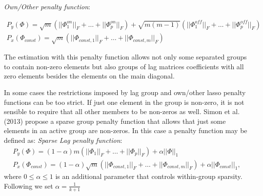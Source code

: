 \documentclass[12pt]{article} %
\begin{document}
\textit{Own/Other penalty function}:  

\begin{gather}
P_y(\Phi) = \sqrt{m} \left( ||\Phi_1^{on}||_{F}+\ldots + ||\Phi_p^{on}||_{F} \right)+\sqrt{m(m-1)}\left( ||\Phi_1^{off}||_{F}+\ldots + ||\Phi_p^{off}||_{F} \right) \\
P_x(\Phi_{const})= \sqrt{m}  \left( ||\Phi_{const,1}||_{F}+\ldots + ||\Phi_{const,m}||_{F} \right)
\end{gather}

The estimation with this penalty function allows not only some separated groups to contain non-zero elements but also groups of lag matrices coefficients with all zero elements besides the elements on the main diagonal. 

In some cases the restrictions imposed by lag group and own/other lasso penalty functions can be too strict. If just one element in the group is non-zero, it is not sensible to require that all other members to be non-zeros as well. 
Simon et al.(2013) propose a sparse group penalty function that allows that just some elements in an active group are non-zeros.
In this case a penalty function may be defined as: 
\textit{Sparse Lag penalty function}:  
\begin{gather}
P_y(\Phi) = (1-\alpha) m \left( ||\Phi_1||_{F}+\ldots + ||\Phi_p||_{F}\right)+\alpha||\Phi||_1\\
P_x(\Phi_{const})= (1-\alpha)\sqrt{m}  \left( ||\Phi_{const,1}||_{F}+\ldots + ||\Phi_{const,m}||_{F} \right)+\alpha ||\Phi_{const}||_1,
\end{gather}
where $0\le \alpha \le 1$ is an additional parameter that controls within-group sparsity. Following  \autocite{nicholson_al_2017} we set $\alpha = \frac{1}{k+1}$ 
\end{document}
